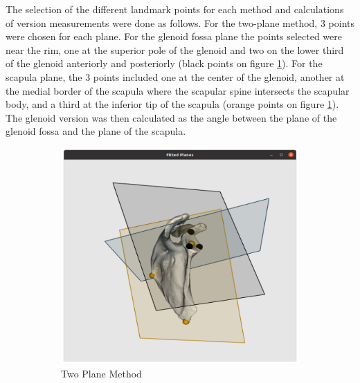 The selection of the different landmark points for each method and calculations of version measurements were done as follows. For the two-plane method, 3 points were chosen for each plane. For the glenoid fossa plane the points selected were near the rim, one at the superior pole of the glenoid and two on the lower third of the glenoid anteriorly and posteriorly (black points on figure \ref{fig:visplanes}).  For the scapula plane, the 3 points included one at the center of the glenoid, another at the medial border of the scapula where the scapular spine intersects the scapular body, and a third at the inferior tip of the scapula (orange points on figure \ref{fig:visplanes}). The glenoid version was then calculated as the angle between the plane of the glenoid fossa and the plane of the scapula. 

\begin{figure}
        \begin{center}
                \begin{subfigure}[b]{0.30\linewidth}
			\includegraphics[width=\linewidth]{figures/planes_vis.png}
			\caption{\label{fig:visplanes}Two Plane Method}
		\end{subfigure}	
                \begin{subfigure}[b]{0.30\linewidth}

\end{subfigure}
\end{center}
\end{figure}

